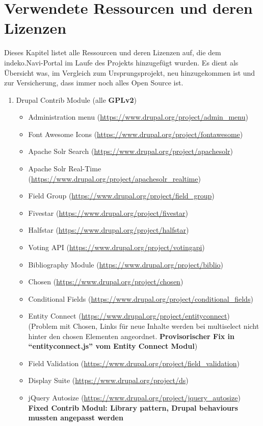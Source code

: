 \section{Verwendete Ressourcen und deren Lizenzen}\label{sub:license}
Dieses Kapitel listet alle Ressourcen und deren Lizenzen auf, die dem \acrshort{indeko}.Navi-Portal im Laufe des Projekts hinzugefügt wurden. Es dient als Übersicht was, im Vergleich zum Ursprungsprojekt, neu hinzugekommen ist und zur Versicherung, dass immer noch alles Open Source ist.

\begin{enumerate}
	\item Drupal Contrib Module (alle \textbf{GPLv2})
	\begin{itemize}
		\item Administration menu (\url{https://www.drupal.org/project/admin_menu})
		\item Font Awesome Icons (\url{https://www.drupal.org/project/fontawesome})
		\item Apache Solr Search (\url{https://www.drupal.org/project/apachesolr})
		\item Apache Solr Real-Time (\url{https://www.drupal.org/project/apachesolr_realtime})
		\item Field Group (\url{https://www.drupal.org/project/field_group})
		\item Fivestar (\url{https://www.drupal.org/project/fivestar})
		\item Halfstar (\url{https://www.drupal.org/project/halfstar})
		\item Voting API (\url{https://www.drupal.org/project/votingapi})
		\item Bibliography Module (\url{https://www.drupal.org/project/biblio})
		\item Chosen (\url{https://www.drupal.org/project/chosen})
		\item Conditional Fields (\url{https://www.drupal.org/project/conditional_fields})
		\item Entity Connect (\url{https://www.drupal.org/project/entityconnect}) (Problem mit Chosen, Links für neue Inhalte werden bei multiselect nicht hinter den chosen Elementen angeordnet. \textbf{Provisorischer Fix in \enquote{entityconnect.js} vom Entity Connect Modul})
		\item Field Validation (\url{https://www.drupal.org/project/field_validation})
		\item Display Suite (\url{https://www.drupal.org/project/ds})
		\item jQuery Autosize (\url{https://www.drupal.org/project/jquery_autosize}) \textbf{Fixed Contrib Modul: Library pattern, Drupal behaviours mussten angepasst werden}
	\end{itemize}


\end{enumerate}
